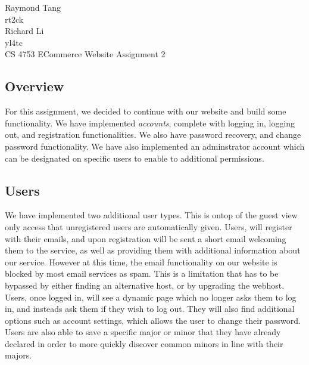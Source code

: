 \documentclass{article}
\begin{document}
\begin{singlespace}
\noindent Raymond Tang\\
rt2ck\\
Richard Li\\
yl4tc\\
CS 4753 ECommerce Website Assignment 2\\
\end{singlespace}

\begin{doublespace}
\subsection*{Overview}
\indent For this assignment, we decided to continue with our website and build some functionality. We have implemented \emph{accounts}, complete with logging in, logging out, and registration functionalities. We also have password recovery, and change password functionality. We have also implemented an adminstrator account which can be designated on specific users to enable to additional permissions.

\subsection*{Users}
\indent We have implemented two additional user types. This is ontop of the guest view only access that unregistered users are automatically given. Users, will register with their emails, and upon registration will be sent a short email welcoming them to the service, as well as providing them with additional information about our service. However at this time, the email functionality on our website is blocked by most email services as spam. This is a limitation that has to be bypassed by either finding an alternative host, or by upgrading the webhost.\\
\indent Users, once logged in, will see a dynamic page which no longer asks them to log in, and insteads ask them if they wish to log out. They will also find additional options such as account settings, which allows the user to change their password.\\
\indent Users are also able to save a specific major or minor that they have already declared in order to more quickly discover common minors in line with their majors.

\end{doublespace}
\end{document}
